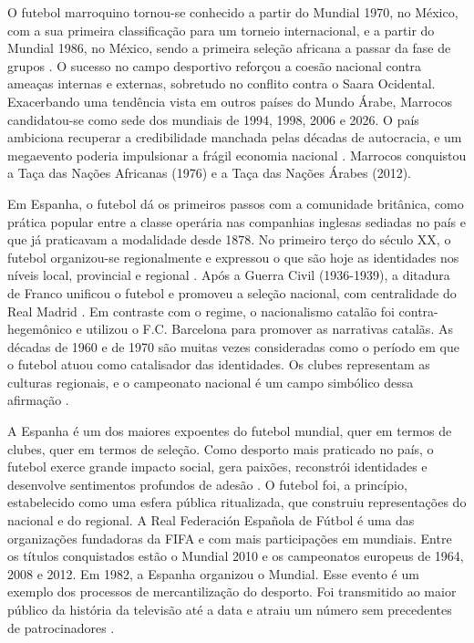 \documentclass{textolivre}
\begin{document}
O futebol marroquino tornou-se conhecido a partir do Mundial 1970, no México, com a sua primeira classificação para um torneio internacional, e a partir do Mundial 1986, no México, sendo a primeira seleção africana a passar da fase de grupos \cite{alami2018}. O sucesso no campo desportivo reforçou a coesão nacional contra ameaças internas e externas, sobretudo no conflito contra o Saara Ocidental. Exacerbando uma tendência vista em outros países do Mundo Árabe, Marrocos candidatou-se como sede dos mundiais de 1994, 1998, 2006 e 2026. O país ambiciona recuperar a credibilidade manchada pelas décadas de autocracia, e um megaevento poderia impulsionar a frágil economia nacional \cite{el-caid2006}. Marrocos conquistou a Taça das Nações Africanas (1976) e a Taça das Nações Árabes (2012).

Em Espanha, o futebol dá os primeiros passos com a comunidade britânica, como prática popular entre a classe operária nas companhias inglesas sediadas no país e que já praticavam a modalidade desde 1878. No primeiro terço do século XX, o futebol organizou-se regionalmente e expressou o que são hoje as identidades nos níveis local, provincial e regional \cite{quiroga2013, tunon2012}. Após a Guerra Civil (1936-1939), a ditadura de Franco unificou o futebol e promoveu a seleção nacional, com centralidade do Real Madrid \cite{tunon2012}. Em contraste com o regime, o nacionalismo catalão foi contra-hegemônico e utilizou o F.C. Barcelona para promover as narrativas catalãs. As décadas de 1960 e de 1970 são muitas vezes consideradas como o período em que o futebol atuou como catalisador das identidades. Os clubes representam as culturas regionais, e o campeonato nacional é um campo simbólico dessa afirmação \cite{quiroga2013}.

A Espanha é um dos maiores expoentes do futebol mundial, quer em termos de clubes, quer em termos de seleção. Como desporto mais praticado no país, o futebol exerce grande impacto social, gera paixões, reconstrói identidades e desenvolve sentimentos profundos de adesão \cite{tunon2012}. O futebol foi, a princípio, estabelecido como uma esfera pública ritualizada, que construiu representações do nacional e do regional. A Real Federación Española de Fútbol é uma das organizações fundadoras da FIFA e com mais participações em mundiais. Entre os títulos conquistados estão o Mundial 2010 e os campeonatos europeus de 1964, 2008 e 2012. Em 1982, a Espanha organizou o Mundial. Esse evento é um exemplo dos processos de mercantilização do desporto. Foi transmitido ao maior público da história da televisão até a data e atraiu um número sem precedentes de patrocinadores \cite{llopis_goig2016}.
\end{document}
